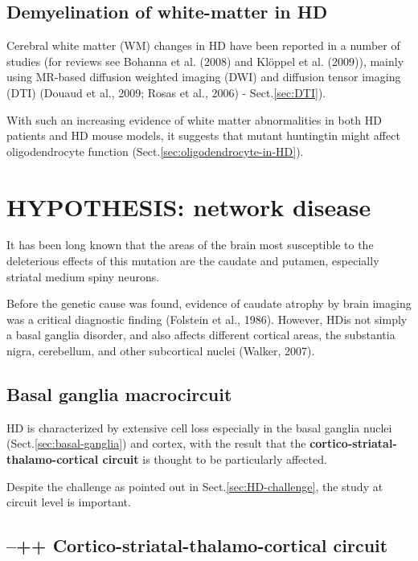 \subsection{Demyelination of white-matter in HD}
\label{sec:HD-theory-demyelination}


Cerebral white matter (WM) changes in HD have been reported in a number of
studies (for reviews see Bohanna et al. (2008) and Klöppel et al. (2009)),
mainly using MR-based diffusion weighted imaging (DWI) and diffusion tensor
imaging (DTI) (Douaud et al., 2009; Rosas et al., 2006) - Sect.\ref{sec:DTI}).

With such an increasing evidence of white matter abnormalities in both HD
patients and HD mouse models, it suggests that mutant huntingtin might affect
oligodendrocyte function (Sect.\ref{sec:oligodendrocyte-in-HD}).


 


\section{HYPOTHESIS: network disease}


It has been long known that the areas of the brain most susceptible to the
deleterious effects of this mutation are the caudate and putamen, especially
striatal medium spiny neurons.

Before the genetic cause was found, evidence of caudate atrophy by brain imaging
was a critical diagnostic finding (Folstein et al., 1986). 
However, HDis not simply a basal ganglia disorder, and also affects different
cortical areas, the substantia nigra, cerebellum, and other subcortical nuclei
(Walker, 2007).


\subsection{Basal ganglia macrocircuit}
\label{sec:HD-theory-BG-macrocircuit}

HD is characterized by extensive cell loss especially in the basal ganglia
nuclei (Sect.\ref{sec:basal-ganglia}) and cortex, with the result that the
{\bf cortico-striatal-thalamo-cortical circuit} is thought to be particularly
affected.


Despite the challenge as pointed out in Sect.\ref{sec:HD-challenge}, 
the study at circuit level is important. 


\subsection{--++ Cortico-striatal-thalamo-cortical circuit}
\label{sec:HD-role-of-cortico-striatal-thalamo-cortical-circuit}

